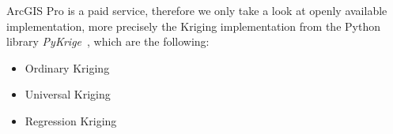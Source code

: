 ArcGIS Pro is a paid service, therefore we only take a look at openly available implementation, more precisely the Kriging implementation from the Python library \textit{PyKrige}~\cite{benjamin_murphy_2022_7008206}, which are the following:

\begin{itemize}
    \item Ordinary Kriging
    \item Universal Kriging
    \item Regression Kriging
\end{itemize}
